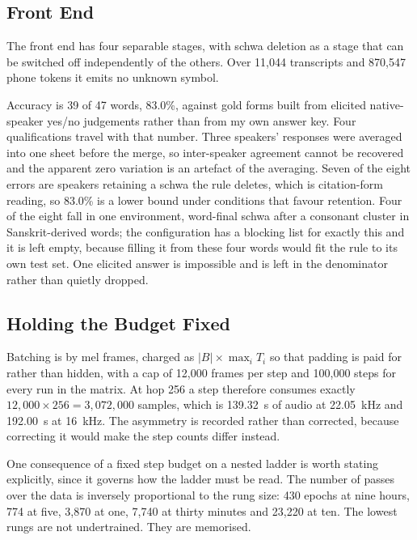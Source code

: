 \documentclass[runningheads]{llncs}
\begin{document}
\subsection{Front End}

The front end has four separable stages, with schwa deletion as a stage that
can be switched off independently of the others. Over 11{,}044 transcripts and
870{,}547 phone tokens it emits no unknown symbol.

Accuracy is 39 of 47 words, 83.0\%, against gold forms built from elicited
native-speaker yes/no judgements rather than from my own answer key. Four
qualifications travel with that number. Three speakers' responses were
averaged into one sheet before the merge, so inter-speaker agreement cannot be
recovered and the apparent zero variation is an artefact of the averaging.
Seven of the eight errors are speakers retaining a schwa the rule deletes,
which is citation-form reading, so 83.0\% is a lower bound under conditions
that favour retention. Four of the eight fall in one environment, word-final
schwa after a consonant cluster in Sanskrit-derived words; the configuration
has a blocking list for exactly this and it is left empty, because filling it
from these four words would fit the rule to its own test set. One elicited
answer is impossible and is left in the denominator rather than quietly
dropped.

\subsection{Holding the Budget Fixed}
\label{sec:budget}

Batching is by mel frames, charged as $|B| \times \max_i T_i$ so that padding
is paid for rather than hidden, with a cap of 12{,}000 frames per step and
100{,}000 steps for every run in the matrix. At hop 256 a step therefore
consumes exactly $12{,}000 \times 256 = 3{,}072{,}000$ samples, which is
139.32~s of audio at 22.05~kHz and 192.00~s at 16~kHz. The asymmetry is
recorded rather than corrected, because correcting it would make the step
counts differ instead.

One consequence of a fixed step budget on a nested ladder is worth stating
explicitly, since it governs how the ladder must be read. The number of passes
over the data is inversely proportional to the rung size: 430 epochs at nine
hours, 774 at five, 3{,}870 at one, 7{,}740 at thirty minutes and 23{,}220 at
ten. The lowest rungs are not undertrained. They are memorised.
\end{document}
